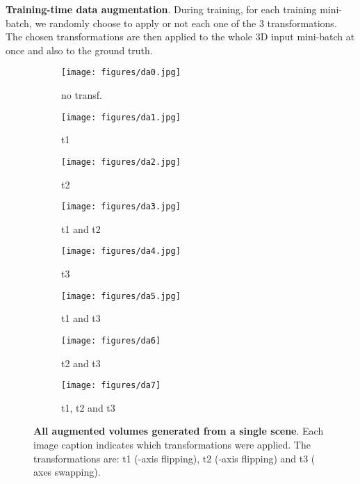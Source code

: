 \textbf{Training-time data augmentation}. During training, for each training mini-batch, we randomly choose to apply or not each one of the 3 transformations. The chosen transformations are then applied to the whole 3D input mini-batch at once and also to the ground truth. 

\begin{figure}[hbt]
\centering  


\begin{subfigure}{0.15\textwidth}
\texttt{[image: figures/da0.jpg]}
\vspace*{-6mm}
\caption{no transf.}
\end{subfigure}
\begin{subfigure}{0.15\textwidth}
\texttt{[image: figures/da1.jpg]}
\vspace*{-6mm}
\caption{t1}
\end{subfigure}
\begin{subfigure}{0.15\textwidth}
\texttt{[image: figures/da2.jpg]}
\vspace*{-6mm}
\caption{t2}
\end{subfigure}
\begin{subfigure}{0.15\textwidth}
\texttt{[image: figures/da3.jpg]}
\vspace*{-6mm}
\caption{t1 and t2}
\end{subfigure}
\begin{subfigure}{0.15\textwidth}
\texttt{[image: figures/da4.jpg]}
\vspace*{-6mm}
\caption{t3}
\end{subfigure}
\begin{subfigure}{0.15\textwidth}
\texttt{[image: figures/da5.jpg]}
\vspace*{-6mm}
\caption{t1 and t3}
\end{subfigure}
\begin{subfigure}{0.15\textwidth}
\texttt{[image: figures/da6]}
\vspace*{-6mm}
\caption{t2 and t3}
\end{subfigure}
\begin{subfigure}{0.15\textwidth}
\texttt{[image: figures/da7]}
\vspace*{-6mm}
\caption{t1, t2 and t3}
\end{subfigure}
\caption{\textbf{All augmented volumes generated from a single scene}. Each image caption indicates which transformations were applied. The transformations are: t1 (-axis flipping), t2 (-axis flipping) and t3 ( axes swapping). } \label{fig:da}
\end{figure}
 
